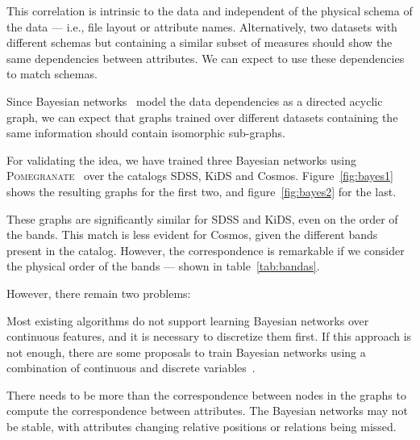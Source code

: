 This correlation is intrinsic to the data and independent of the physical
schema of the data --- i.e., file layout or attribute names. Alternatively,
two datasets with different schemas but containing a similar subset of
measures should show the same dependencies between attributes. We can
expect to use these dependencies to match schemas\footnotemark.


Since Bayesian networks~\cite{pearl1988}  model the data dependencies
as a directed acyclic graph, we can expect that graphs trained over different
datasets containing the same information should contain isomorphic sub-graphs.

For validating the idea, we have trained three Bayesian networks using\linebreak
\textsc{Pomegranate}~\cite{schreiber_pomegranate_2017} over the catalogs
\gls{SDSS}, \gls{KiDS} and \gls{Cosmos}. Figure~\ref{fig:bayes1} shows the
resulting graphs for the first two, and figure~\ref{fig:bayes2} for the last.

These graphs are significantly similar for \gls{SDSS} and \gls{KiDS},
even on the order of the bands. This match is less evident for \gls{Cosmos},
given the different bands present in the catalog. However, the correspondence is
remarkable if we consider the physical order of the bands --- shown in table~\ref{tab:bandas}.

However, there remain two problems:

Most existing algorithms do not support learning Bayesian networks over continuous features,
and it is necessary to discretize them first. If this approach is not enough, there are some
proposals to train Bayesian networks using a combination of continuous and discrete
variables~\cite{Lucas2015,chen2017}.

There needs to be more than the correspondence between nodes in the graphs to compute
the correspondence between attributes. The Bayesian networks may not be stable, with
attributes changing relative positions or relations being missed.


